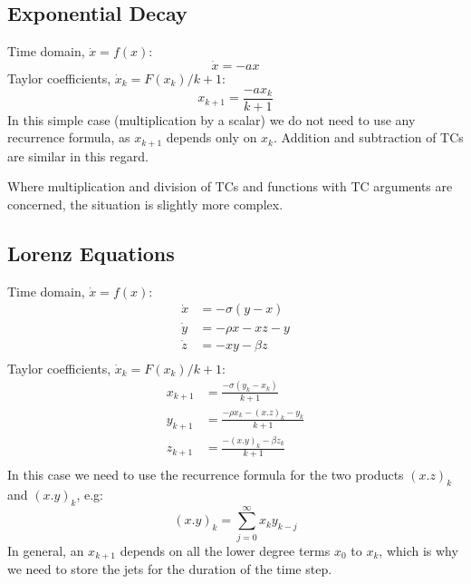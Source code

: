\documentclass[11pt]{article}
\begin{document}
\subsection{Exponential Decay}
Time domain, $\dot{x} = f(x)$:
\begin{equation}
\dot{x} = - a x
\end{equation}
Taylor coefficients, $\dot{x}_k = F(x_k) / k + 1$:
\begin{equation}
x_{k+1} = \frac{- a x_k} {k + 1}
\end{equation}
In this simple case (multiplication by a scalar) we do not need to use any recurrence formula, as $x_{k+1}$ depends only on $x_k$.
Addition and subtraction of TCs are similar in this regard.

Where multiplication and division of TCs and functions with TC arguments are concerned, the situation is slightly more complex.
\subsection{Lorenz Equations}
Time domain, $\dot{x} = f(x)$:
\begin{equation}
\begin{aligned}
\dot{x} &= - \sigma (y - x) \\
\dot{y} &= - \rho x - xz - y \\
\dot{z} &= - xy - \beta z \\
\end{aligned}
\end{equation}
Taylor coefficients, $\dot{x}_k = F(x_k) / k + 1$:
\begin{equation}
\begin{aligned}
x_{k+1} &= \frac{- \sigma (y_k - x_k)}{k + 1} \\
y_{k+1} &= \frac{- \rho x_k - (x.z)_k - y_k}{k + 1} \\
z_{k+1} &= \frac{- (x.y)_k - \beta z_k}{k + 1} \\
\end{aligned}
\end{equation}
In this case we need to use the recurrence formula for the two products $(x.z)_k$ and $(x.y)_k$, e.g:
\begin{equation}
(x.y)_k = \sum_{j=0}^{\infty} x_k y_{k - j}
\end{equation}
In general, an $x_{k+1}$ depends on all the lower degree terms $x_0$ to $x_k$, which is why we need to store the jets for the duration of the time step.
\end{document}
